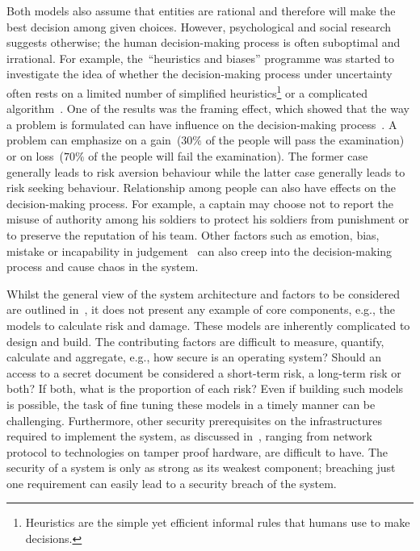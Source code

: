 Both models also assume that entities are rational and therefore will
make the best decision among given choices. However, psychological and
social research suggests otherwise; the human decision-making process
is often suboptimal and irrational. For example, the~``heuristics and
biases'' programme was started to investigate the idea of whether the
decision-making process under uncertainty often rests on a limited
number of simplified heuristics\footnote{Heuristics are the simple yet
  efficient informal rules that humans use to make decisions.} or a
complicated algorithm~\cite{AT74}. One of the results was the framing
effect, which showed that the way a problem is formulated can have
influence on the decision-making process~\cite{AT81}. A problem can
emphasize on a gain~($30\%$ of the people will pass the examination)
or on loss~($70\%$ of the people will fail the examination). The
former case generally leads to risk aversion behaviour while the
latter case generally leads to risk seeking behaviour. Relationship
among people can also have effects on the decision-making process. For
example, a captain may choose not to report the misuse of authority
among his soldiers to protect his soldiers from punishment or to
preserve the reputation of his team. Other factors such as emotion,
bias, mistake or incapability in judgement~\cite{DK82} can also creep
into the decision-making process and cause chaos in the system.

Whilst the general view of the system architecture and factors to be
considered are outlined in~\cite{JPO04}, it does not present any
example of core components, e.g., the models to calculate risk and
damage. These models are inherently complicated to design and
build. The contributing factors are difficult to measure, quantify,
calculate and aggregate, e.g., how secure is an operating system?
Should an access to a secret document be considered a short-term risk,
a long-term risk or both? If both, what is the proportion of each
risk? Even if building such models is possible, the task of fine
tuning these models in a timely manner can be
challenging. Furthermore, other security prerequisites on the
infrastructures required to implement the system, as discussed
in~\cite{JPO04}, ranging from network protocol to technologies on
tamper proof hardware, are difficult to have. The security of a system
is only as strong as its weakest component; breaching just one
requirement can easily lead to a security breach of the system.

